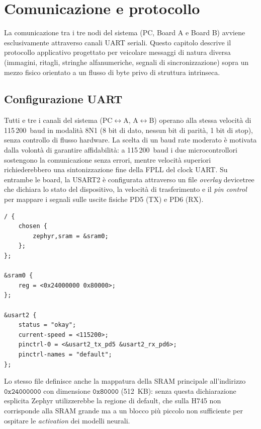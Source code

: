 \chapter{Comunicazione e protocollo}
\label{cap:comunicazione}

La comunicazione tra i tre nodi del sistema (PC, Board A e Board B) avviene esclusivamente attraverso canali UART seriali. Questo capitolo descrive il protocollo applicativo progettato per veicolare messaggi di natura diversa (immagini, ritagli, stringhe alfanumeriche, segnali di sincronizzazione)  sopra un mezzo fisico orientato a un flusso di byte privo di struttura intrinseca.

\section{Configurazione UART}
\label{sec:uart-config}

Tutti e tre i canali del sistema (PC$\leftrightarrow$A, A$\leftrightarrow$B) operano alla stessa velocità di 115\,200~baud in modalità 8N1 (8 bit di dato, nessun bit di parità, 1 bit di stop), senza controllo di flusso hardware. La scelta di un baud rate moderato è motivata dalla volontà di garantire affidabilità: a 115\,200~baud i due microcontrollori sostengono la comunicazione senza errori, mentre velocità superiori richiederebbero una sintonizzazione fine della FPLL del clock UART. Su entrambe le board, la USART2 è configurata attraverso un file \textit{overlay} devicetree che dichiara lo stato del dispositivo, la velocità di trasferimento e il \textit{pin control} per mappare i segnali sulle uscite fisiche PD5 (TX) e PD6 (RX).

\begin{lstlisting}[style=stileDevicetree, caption={Overlay devicetree per l'abilitazione della USART2 con clock a 115\,200~baud.}, label={lst:overlay}]
/ {
    chosen {
        zephyr,sram = &sram0;
    };
};

&sram0 {
    reg = <0x24000000 0x80000>;
};

&usart2 {
    status = "okay";
    current-speed = <115200>;
    pinctrl-0 = <&usart2_tx_pd5 &usart2_rx_pd6>;
    pinctrl-names = "default";
};
\end{lstlisting}

Lo stesso file definisce anche la mappatura della SRAM principale all'indirizzo $\mathtt{0x24000000}$ con dimensione $\mathtt{0x80000}$ (512~KB): senza questa dichiarazione esplicita Zephyr utilizzerebbe la regione di default, che sulla H745 non corrisponde alla SRAM grande ma a un blocco più piccolo non sufficiente per ospitare le \textit{activation} dei modelli neurali.

